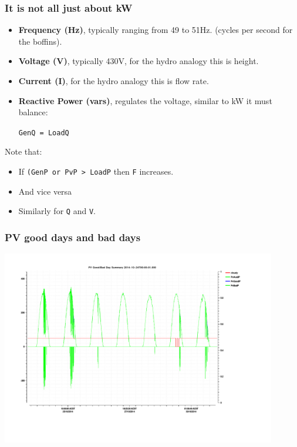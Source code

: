 \documentclass[a4paper,handout]{beamer}
\begin{document}
\begin{frame}\frametitle{It is not all just about kW}
  \begin{itemize}
  \item \textbf{Frequency (Hz)}, typically ranging from 49 to 51Hz.
    (cycles per second for the boffins).
  \item \textbf{Voltage (V)}, typically 430V, for the hydro analogy
    this is height.
  \item \textbf{Current (I)}, for the hydro analogy this is flow rate.
    \pause
  \item \textbf{Reactive Power (vars)}, regulates the voltage, similar
    to kW it must balance:
    
    \texttt{GenQ = LoadQ}
  \end{itemize}
  Note that:
  \begin{itemize}
  \item If \texttt{(GenP or PvP > LoadP} then \texttt{F} increases.
  \item And vice versa
  \item Similarly for \texttt{Q} and \texttt{V}.
  \end{itemize}
\end{frame}

\begin{frame}\frametitle{PV good days and bad days}
  \includegraphics[width=12cm]{stuff/gday.pdf}
\end{frame}
\end{document}

